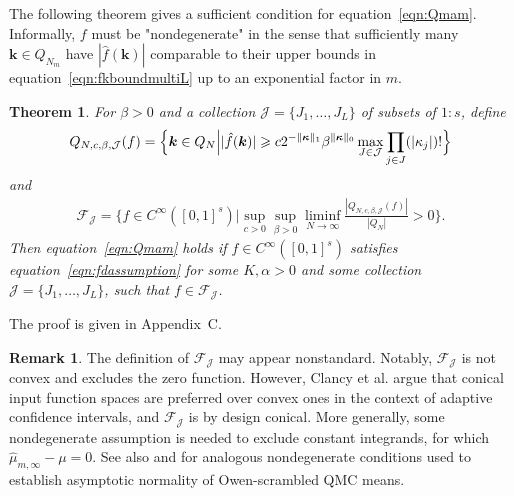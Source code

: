 \documentclass{article}
\newtheorem{theorem}{Theorem}
\theoremstyle{definition}
\newtheorem{remark}{Remark}
\renewcommand{\geq}{\geqslant}
\newcommand{\cj}{\mathcal{J}}
\newcommand{\bsk}{\boldsymbol{k}}
\newcommand{\bskappa}{\boldsymbol{\kappa}}
\newcommand{\appC}{C}
\begin{document}
The following theorem gives a sufficient condition for equation~\eqref{eqn:Qmam}. Informally, $f$ must be "nondegenerate" in the sense that sufficiently many $\bsk\in Q_{N_m}$ have $|\hat{f}(\bsk)|$ comparable to their upper bounds in equation~\eqref{eqn:fkboundmultiL} up to an exponential factor in $m$.

\begin{theorem}\label{thm:step3}
For $\beta>0$ and a collection $\cj=\{J_1,\dots,J_L\}$ of subsets of $1{:}s$, define
            \begin{equation*}
        Q_{N,c,\beta,\cj}(f)=\Bigl\{\bsk\in Q_N \Big\vert |\hat{f}(\bsk)|\geq  c 2^{-\Vert\bskappa\Vert_1}\beta^{\Vert\bskappa\Vert_0}\max_{J\in \cj} \prod_{j\in J} (|\kappa_j|)!\Bigr\}
            \end{equation*}
            and
\begin{align*}
  \mathcal{F}_{\cj}=\Big\{f\in C^{\infty}([0,1]^s) \Big\vert \sup_{c>0}\sup_{\beta>0}\liminf_{N\to\infty}\frac{|Q_{N,c,\beta,\cj}(f)|}{|Q_{N}|} >0  \Big\}.  
\end{align*}
Then equation~\eqref{eqn:Qmam} holds if $f\in C^{\infty}([0,1]^s)$ satisfies equation~\eqref{eqn:fdassumption} for some $K,\alpha>0$ and some collection $\cj=\{J_1,\dots,J_L\}$, such that $f\in \mathcal{F}_{\cj}$.
\end{theorem}

The proof is given in Appendix~\appC.

\begin{remark}
    The definition of $\mathcal{F}_{\cj}$ may appear nonstandard. Notably, $\mathcal{F}_{\cj}$ is not convex and excludes the zero function. However, Clancy et al. \cite{CLANCY201421} argue that conical input function spaces are preferred over convex ones in the context of adaptive confidence intervals, and $\mathcal{F}_{\cj}$ is by design conical. More generally, some nondegenerate assumption is needed to exclude constant integrands, for which $\hat{\mu}_{m,\infty}-\mu=0$.
    See also \cite[Theorem 2]{loh:2003} and \cite[Theorem 2]{basu2017asymptotic} for analogous nondegenerate conditions used to establish asymptotic normality of Owen-scrambled QMC means.
\end{remark}
\end{document}
